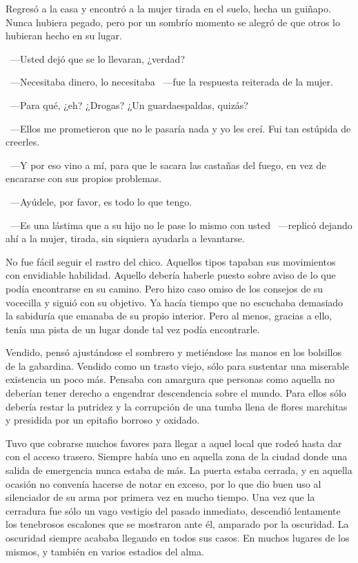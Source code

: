 Regresó a la casa y encontró a la mujer tirada en el suelo, hecha un guiñapo. Nunca  hubiera pegado, pero por un sombrío momento se alegró de que otros lo hubieran hecho en su lugar.

~---Usted dejó que se lo llevaran, ¿verdad?

~---Necesitaba dinero, lo necesitaba ~---fue la respuesta reiterada de la mujer.

~---Para qué, ¿eh? ¿Drogas? ¿Un guardaespaldas, quizás?

~---Ellos me prometieron que no le pasaría nada y yo les creí. Fui tan estúpida de creerles.

~---Y por eso vino a mí, para que le sacara las castañas del fuego, en vez de encararse con sus propios problemas.

~---Ayúdele, por favor, es todo lo que tengo.

~---Es una lástima que a su hijo no le pase lo mismo con usted ~---replicó dejando ahí a la mujer, tirada, sin siquiera ayudarla a levantarse.

\parbreak
No fue fácil seguir el rastro del chico. Aquellos tipos tapaban sus movimientos con envidiable habilidad. Aquello debería haberle puesto sobre aviso de lo que podía encontrarse en su camino. Pero hizo caso omiso de los consejos de su vocecilla y siguió con su objetivo. Ya hacía tiempo que no escuchaba demasiado la sabiduría que emanaba de su propio interior. Pero al menos, gracias a ello, tenía una pista de un lugar donde tal vez podía encontrarle.

Vendido, pensó ajustándose el sombrero y metiéndose las manos en los bolsillos de la gabardina. Vendido como un trasto viejo, sólo para sustentar una miserable existencia un poco más. Pensaba con amargura que personas como aquella no deberían tener derecho a engendrar descendencia sobre el mundo. Para ellos sólo debería restar la putridez y la corrupción de una tumba llena de flores marchitas y presidida por un epitafio borroso y oxidado.

Tuvo que cobrarse muchos favores para llegar a aquel local que rodeó hasta dar con el acceso trasero. Siempre había uno en aquella zona de la ciudad donde una salida de emergencia nunca estaba de más. La puerta estaba cerrada, y en aquella ocasión no convenía hacerse de notar en exceso, por lo que dio buen uso al silenciador de su arma por primera vez en mucho tiempo. Una vez que la cerradura fue sólo un vago vestigio del pasado inmediato, descendió lentamente los tenebrosos escalones que se mostraron ante él, amparado por la oscuridad. La oscuridad siempre acababa llegando en todos sus casos. En muchos lugares de los mismos, y también en varios estadios del alma.


